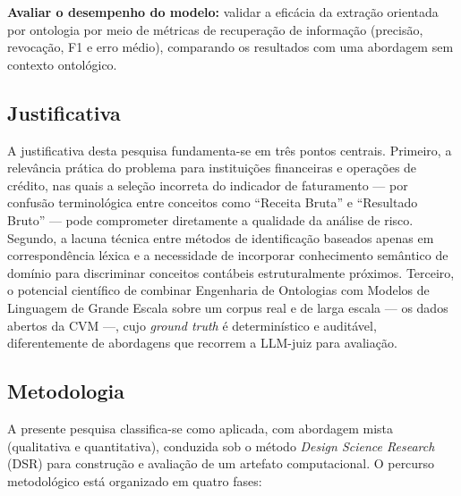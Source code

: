 \documentclass[12pt,a4paper]{article}
\begin{document}
\textbf{Avaliar o desempenho do modelo:} validar a eficácia da extração orientada por ontologia por meio de métricas de recuperação de informação (precisão, revocação, F1 e erro médio), comparando os resultados com uma abordagem sem contexto ontológico.

\subsection{Justificativa}

A justificativa desta pesquisa fundamenta-se em três pontos centrais. Primeiro, a relevância prática do problema para instituições financeiras e operações de crédito, nas quais a seleção incorreta do indicador de faturamento --- por confusão terminológica entre conceitos como ``Receita Bruta'' e ``Resultado Bruto'' --- pode comprometer diretamente a qualidade da análise de risco. Segundo, a lacuna técnica entre métodos de identificação baseados apenas em correspondência léxica e a necessidade de incorporar conhecimento semântico de domínio para discriminar conceitos contábeis estruturalmente próximos. Terceiro, o potencial científico de combinar Engenharia de Ontologias com Modelos de Linguagem de Grande Escala sobre um corpus real e de larga escala --- os dados abertos da CVM ---, cujo \textit{ground truth} é determinístico e auditável, diferentemente de abordagens que recorrem a LLM-juiz para avaliação.

\subsection{Metodologia}

A presente pesquisa classifica-se como aplicada, com abordagem mista (qualitativa e quantitativa), conduzida sob o método \textit{Design Science Research} (DSR) para construção e avaliação de um artefato computacional. O percurso metodológico está organizado em quatro fases:
\end{document}
